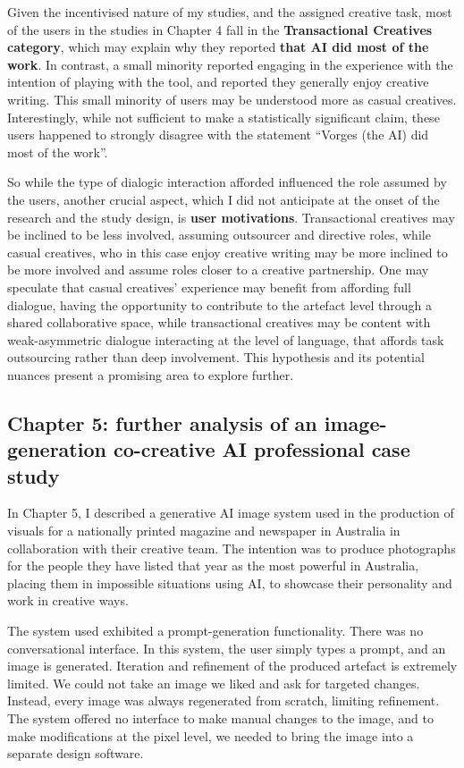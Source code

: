 Given the incentivised nature of my studies, and the assigned creative task, most of the users in the studies in Chapter 4 fall in the \textbf{Transactional Creatives category}, which may explain why they reported \textbf{that AI did most of the work}. In contrast, a small minority reported engaging in the experience with the intention of playing with the tool, and reported they generally enjoy creative writing. This small minority of users may be understood more as casual creatives. Interestingly, while not sufficient to make a statistically significant claim, these users happened to strongly disagree with the statement ``Vorges (the AI) did most of the work''. 

So while the type of dialogic interaction afforded influenced the role assumed by the users, another crucial aspect, which I did not anticipate at the onset of the research and the study design, is \textbf{user motivations}. Transactional creatives may be inclined to be less involved, assuming outsourcer and directive roles, while casual creatives, who in this case enjoy creative writing may be more inclined to be more involved and assume roles closer to a creative partnership. One may speculate that casual creatives' experience may benefit from affording full dialogue, having the opportunity to contribute to the artefact level through a shared collaborative space, while transactional creatives may be content with weak-asymmetric dialogue interacting at the level of language, that affords task outsourcing rather than deep involvement. This hypothesis and its potential nuances present a promising area to explore further. 

\subsection{Chapter 5: further analysis of an image-generation co-creative AI professional case study}

In Chapter 5, I described a generative AI image system used in the production of visuals for a nationally printed magazine and newspaper in Australia in collaboration with their creative team. The intention was to produce photographs for the people they have listed that year as the most powerful in Australia, placing them in impossible situations using AI, to showcase their personality and work in creative ways.

The system used exhibited a prompt-generation functionality. There was no conversational interface. In this system, the user simply types a prompt, and an image is generated. Iteration and refinement of the produced artefact is extremely limited. We could not take an image we liked and ask for targeted changes. Instead, every image was always regenerated from scratch, limiting refinement. The system offered no interface to make manual changes to the image, and to make modifications at the pixel level, we needed to bring the image into a separate design software.

